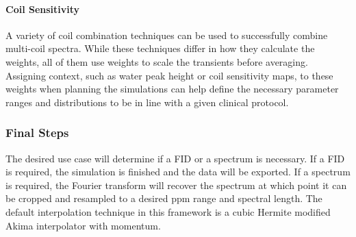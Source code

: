 
 
\paragraph{Coil Sensitivity}
A variety of coil combination techniques can be used to successfully combine multi-coil spectra. While these techniques differ in how they calculate the weights, all of them use weights to scale the transients before averaging. Assigning context, such as water peak height or coil sensitivity maps, to these weights when planning the simulations can help define the necessary parameter ranges and distributions to be in line with a given clinical protocol.
 
\subsubsection{Final Steps} The desired use case will determine if a FID or a spectrum is necessary. If a FID is required, the simulation is finished and the data will be exported. If a spectrum is required, the Fourier transform will recover the spectrum at which point it can be cropped and resampled to a desired ppm range and spectral length. The default interpolation technique in this framework is a cubic Hermite modified Akima interpolator with momentum.
